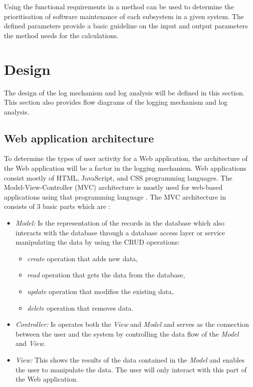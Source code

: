 Using the functional requirements in  a method can be used to determine the prioritisation of software maintenance of each subsystem in a given system. The defined parameters provide a basic guideline on the input and output parameters the method needs for the calculations.

\clearpage

\section{Design}\label{sec:ch2_design}
The design of the log mechanism and log analysis will be defined in this section. This section also provides flow diagrams of the logging mechanism and log analysis.

\subsection{Web application architecture}\label{sec:ch2_webApplicationArchitecture}
To determine the types of user activity for a Web application, the architecture of the Web application will be a factor in the logging mechanism. Web applications consist mostly of HTML, JavaScript, and CSS programming languages. The Model-View-Controller (MVC) architecture is mostly used for web-based applications using that programming language \cite{Jailia2016}. The MVC architecture in  consists of 3 basic parts which are \cite{Jailia2016}:

\begin{itemize}
	\item \textit{Model:} Is the representation of the records in the database which also interacts with the database through a database access layer or service manipulating the data by using the CRUD operations:
	\begin{itemize}
		\item \textit{create} operation that adds new data,
		\item \textit{read} operation that gets the data from the database,
		\item \textit{update} operation that modifies the existing data,
		\item \textit{delete} operation that removes data.
	\end{itemize}
	\item \textit{Controller:} Is operates both the \textit{View} and \textit{Model} and serves as the connection between the user and the system by controlling the data flow of the \textit{Model} and
	\textit{View}.
	\item \textit{View:} This shows the results of the data contained in the \textit{Model} and enables the user to manipulate the data. The user will only interact with this part of the Web application.
\end{itemize}

